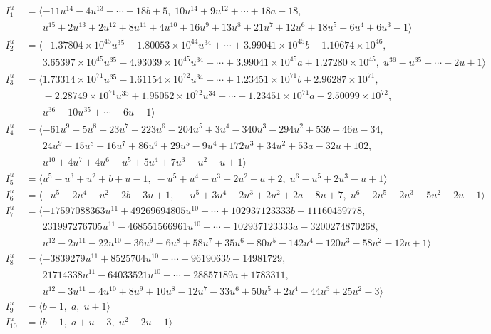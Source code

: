 \documentclass[1p]{elsarticle_modified}
\theoremstyle{definition}
\begin{document}
\begin{align*}
I^u_{1}&=\langle 
-11 u^{14}-4 u^{13}+\cdots+18 b+5,\;10 u^{14}+9 u^{12}+\cdots+18 a-18,\\
\phantom{I^u_{1}}&\phantom{= \langle  }u^{15}+2 u^{13}+2 u^{12}+8 u^{11}+4 u^{10}+16 u^9+13 u^8+21 u^7+12 u^6+18 u^5+6 u^4+6 u^3-1\rangle \\
I^u_{2}&=\langle 
-1.37804\times10^{45} u^{35}-1.80053\times10^{44} u^{34}+\cdots+3.99041\times10^{45} b-1.10674\times10^{46},\\
\phantom{I^u_{2}}&\phantom{= \langle  }3.65397\times10^{45} u^{35}-4.93039\times10^{45} u^{34}+\cdots+3.99041\times10^{45} a+1.27280\times10^{45},\;u^{36}- u^{35}+\cdots-2 u+1\rangle \\
I^u_{3}&=\langle 
1.73314\times10^{71} u^{35}-1.61154\times10^{72} u^{34}+\cdots+1.23451\times10^{71} b+2.96287\times10^{71},\\
\phantom{I^u_{3}}&\phantom{= \langle  }-2.28749\times10^{71} u^{35}+1.95052\times10^{72} u^{34}+\cdots+1.23451\times10^{71} a-2.50099\times10^{72},\\
\phantom{I^u_{3}}&\phantom{= \langle  }u^{36}-10 u^{35}+\cdots-6 u-1\rangle \\
I^u_{4}&=\langle 
-61 u^9+5 u^8-23 u^7-223 u^6-204 u^5+3 u^4-340 u^3-294 u^2+53 b+46 u-34,\\
\phantom{I^u_{4}}&\phantom{= \langle  }24 u^9-15 u^8+16 u^7+86 u^6+29 u^5-9 u^4+172 u^3+34 u^2+53 a-32 u+102,\\
\phantom{I^u_{4}}&\phantom{= \langle  }u^{10}+4 u^7+4 u^6- u^5+5 u^4+7 u^3- u^2- u+1\rangle \\
I^u_{5}&=\langle 
u^5- u^3+u^2+b+u-1,\;- u^5+u^4+u^3-2 u^2+a+2,\;u^6- u^5+2 u^3- u+1\rangle \\
I^u_{6}&=\langle 
- u^5+2 u^4+u^2+2 b-3 u+1,\;- u^5+3 u^4-2 u^3+2 u^2+2 a-8 u+7,\;u^6-2 u^5-2 u^3+5 u^2-2 u-1\rangle \\
I^u_{7}&=\langle 
-17597088363 u^{11}+49269694805 u^{10}+\cdots+102937123333 b-11160459778,\\
\phantom{I^u_{7}}&\phantom{= \langle  }231997276705 u^{11}-468551566961 u^{10}+\cdots+102937123333 a-3200274870268,\\
\phantom{I^u_{7}}&\phantom{= \langle  }u^{12}-2 u^{11}-22 u^{10}-36 u^9-6 u^8+58 u^7+35 u^6-80 u^5-142 u^4-120 u^3-58 u^2-12 u+1\rangle \\
I^u_{8}&=\langle 
-3839279 u^{11}+8525704 u^{10}+\cdots+9619063 b-14981729,\\
\phantom{I^u_{8}}&\phantom{= \langle  }21714338 u^{11}-64033521 u^{10}+\cdots+28857189 a+1783311,\\
\phantom{I^u_{8}}&\phantom{= \langle  }u^{12}-3 u^{11}-4 u^{10}+8 u^9+10 u^8-12 u^7-33 u^6+50 u^5+2 u^4-44 u^3+25 u^2-3\rangle \\
I^u_{9}&=\langle 
b-1,\;a,\;u+1\rangle \\
I^u_{10}&=\langle 
b-1,\;a+u-3,\;u^2-2 u-1\rangle \\
\end{align*}\\
\end{document}
